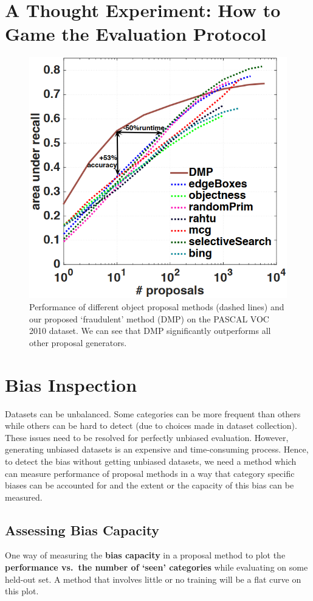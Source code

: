 \documentclass[10pt]{article}
\begin{document}
\section{A Thought Experiment: How to Game the Evaluation Protocol}%
\label{sec:experiment}
%
\begin{figure}[htpb]
  \centering
  \includegraphics[width=0.6\linewidth]{fig_3.png}
  \caption{Performance of different object proposal methods (dashed lines) and
    our proposed `fraudulent' method (DMP) on the PASCAL VOC 2010 dataset. We
    can see that DMP significantly outperforms all other proposal generators.}%
  \label{fig:3}
\end{figure}

\setcounter{section}{5}
\section{Bias Inspection}%
\label{sec:bias}
Datasets can be unbalanced. Some categories can be more frequent than others
while others can be hard to detect (due to choices made in dataset collection).
These issues need to be resolved for perfectly unbiased evaluation. However,
generating unbiased datasets is an expensive and time-consuming process. Hence,
to detect the bias without getting unbiased datasets, we need a method which
can measure performance of proposal methods in a way that category specific
biases can be accounted for and the extent or the capacity of this bias can be
measured.

\subsection{Assessing Bias Capacity}%
\label{sec:assessing}
One way of measuring the \textbf{bias capacity} in a proposal method to plot
the \textbf{performance vs.\ the number of `seen' categories} while evaluating
on some held-out set. A method that involves little or no training will be a
flat curve on this plot.
\end{document}
